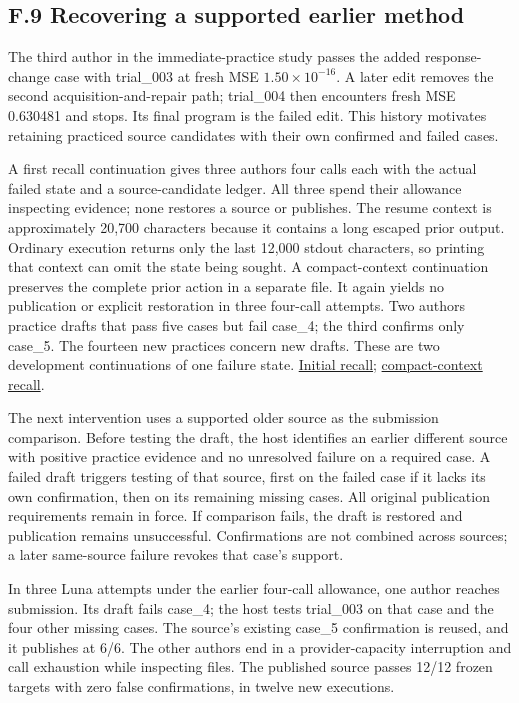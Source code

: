\documentclass[twoside,11pt]{article}
\begin{document}
\subsection*{F.9 Recovering a supported earlier method}

The third author in the immediate-practice study passes the added response-change
case with trial\_003 at fresh MSE \(1.50\times10^{-16}\). A later edit removes the
second acquisition-and-repair path; trial\_004 then encounters fresh MSE 0.630481
and stops. Its final program is the failed edit. This history motivates retaining
practiced source candidates with their own confirmed and failed cases.


A first recall continuation gives three authors four calls each with the actual
failed state and a source-candidate ledger. All three spend their allowance
inspecting evidence; none restores a source or publishes. The resume context is
approximately 20,700 characters because it contains a long escaped prior output.
Ordinary execution returns only the last 12,000 stdout characters, so printing
that context can omit the state being sought. A compact-context continuation
preserves the complete prior action in a separate file. It again yields no
publication or explicit restoration in three four-call attempts. Two authors
practice drafts that pass five cases but fail case\_4; the third confirms only
case\_5. The fourteen new practices concern new drafts. These are two development
continuations of one failure state.
\hyperlink{artifact-94}{Initial recall};
\hyperlink{artifact-95}{compact-context recall}.


The next intervention uses a supported older source as the submission comparison.
Before testing the draft, the host identifies an earlier different source with
positive practice evidence and no unresolved failure on a required case. A failed
draft triggers testing of that source, first on the failed case if it lacks its
own confirmation, then on its remaining missing cases. All original publication
requirements remain in force. If comparison fails, the draft is restored and
publication remains unsuccessful. Confirmations are not combined across sources;
a later same-source failure revokes that case's support.


In three Luna attempts under the earlier four-call allowance, one author reaches
submission. Its draft fails case\_4; the host tests trial\_003 on that case and the
four other missing cases. The source's existing case\_5 confirmation is reused,
and it publishes at 6/6. The other authors end in a provider-capacity interruption
and call exhaustion while inspecting files. The published source passes 12/12
frozen targets with zero false confirmations, in twelve new executions.
\end{document}
